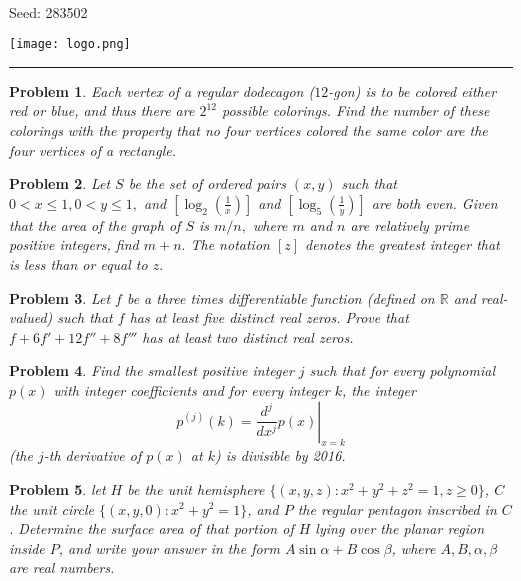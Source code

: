 \documentclass[12pt]{article}
\newtheorem{opg}{Problem}
\begin{document}
\parbox{0.6\textwidth}{ \\[2ex] {\Large Seed: 283502}}
\parbox{0.4\textwidth}{\texttt{[image: logo.png]}}

\hrule

\begin{opg}
Each vertex of a regular dodecagon ($12$-gon) is to be colored either red or blue, and thus there are $2^{12}$ possible colorings. Find the number of these colorings with the property that no four vertices colored the same color are the four vertices of a rectangle.


\end{opg}
\begin{opg}
Let $S$ be the set of ordered pairs $(x, y)$ such that $0 < x \le 1, 0<y\le 1,$ and $\left[\log_2{\left(\frac 1x\right)}\right]$ and $\left[\log_5{\left(\frac 1y\right)}\right]$ are both even. Given that the area of the graph of $S$ is $m/n,$ where $m$ and $n$ are relatively prime positive integers, find $m+n.$ The notation $[z]$ denotes the greatest integer that is less than or equal to $z.$


\end{opg}
\begin{opg}
Let $f$ be a three times differentiable function (defined on $\mathbb{R}$ and real-valued) such that $f$ has at least five distinct real zeros. Prove that $f + 6f' + 12f'' + 8f'''$ has at least two distinct real zeros.

\end{opg}
\begin{opg}
Find the smallest positive integer $j$ such that for every polynomial $p(x)$ with integer coefficients and for every integer $k$, the integer
\[
p^{(j)}(k) = \left. \frac{d^j}{dx^j} p(x) \right|_{x=k} 
\] 
(the $j$-th derivative of $p(x)$ at $k$) is divisible by 2016.

\end{opg}
\begin{opg}
let $H$ be the unit hemisphere $\{(x,y,z):x^2+y^2+z^2=1,z\geq 0\}$, $C$
the unit circle $\{(x,y,0):x^2+y^2=1\}$, and $P$ the regular pentagon
inscribed in $C$.  Determine the surface area of that portion of $H$ lying
over the planar region inside $P$, and write your answer in the form
$A \sin\alpha + B \cos\beta$, where $A,B,\alpha,\beta$ are real numbers.

\end{opg}
\end{document}
